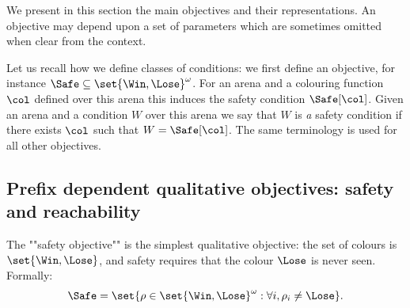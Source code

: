 We present in this section the main objectives and their representations.
An objective may depend upon a set of parameters which are sometimes omitted when clear from the context.

Let us recall how we define classes of conditions: we first define an objective, for instance $\Safe \subseteq \set{\Win,\Lose}^\omega$.
For an arena and a colouring function $\col$ defined over this arena this induces the safety condition $\Safe[\col]$.
Given an arena and a condition $W$ over this arena we say that $W$ is \textit{a} safety condition if 
there exists $\col$ such that $W = \Safe[\col]$.
The same terminology is used for all other objectives.

\subsection*{Prefix dependent qualitative objectives: safety and reachability}
The ""safety objective"" is the simplest qualitative objective:
the set of colours is $\set{\Win,\Lose}$, 
and safety requires that the colour $\Lose$ is never seen.
Formally:
\[
\Safe = \set{\rho \in \set{\Win,\Lose}^\omega : \forall i, \rho_i \neq \Lose}.
\]

